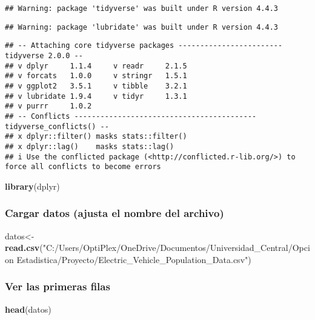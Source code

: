 \documentclass[
]{article}
\newenvironment{Shaded}{\begin{snugshade}}{\end{snugshade}}
\newcommand{\FunctionTok}[1]{\textcolor[rgb]{0.13,0.29,0.53}{\textbf{#1}}}
\newcommand{\NormalTok}[1]{#1}
\newcommand{\OtherTok}[1]{\textcolor[rgb]{0.56,0.35,0.01}{#1}}
\newcommand{\StringTok}[1]{\textcolor[rgb]{0.31,0.60,0.02}{#1}}
\begin{document}
\begin{verbatim}
## Warning: package 'tidyverse' was built under R version 4.4.3
\end{verbatim}

\begin{verbatim}
## Warning: package 'lubridate' was built under R version 4.4.3
\end{verbatim}

\begin{verbatim}
## -- Attaching core tidyverse packages ------------------------ tidyverse 2.0.0 --
## v dplyr     1.1.4     v readr     2.1.5
## v forcats   1.0.0     v stringr   1.5.1
## v ggplot2   3.5.1     v tibble    3.2.1
## v lubridate 1.9.4     v tidyr     1.3.1
## v purrr     1.0.2     
## -- Conflicts ------------------------------------------ tidyverse_conflicts() --
## x dplyr::filter() masks stats::filter()
## x dplyr::lag()    masks stats::lag()
## i Use the conflicted package (<http://conflicted.r-lib.org/>) to force all conflicts to become errors
\end{verbatim}

\begin{Shaded}
\begin{Highlighting}[]
\FunctionTok{library}\NormalTok{(dplyr)}
\end{Highlighting}
\end{Shaded}

\subsubsection{Cargar datos (ajusta el nombre del
archivo)}\label{cargar-datos-ajusta-el-nombre-del-archivo}

\begin{Shaded}
\begin{Highlighting}[]
\NormalTok{datos}\OtherTok{\textless{}{-}} \FunctionTok{read.csv}\NormalTok{(}\StringTok{"C:/Users/OptiPlex/OneDrive/Documentos/Universidad\_Central/Opcion Estadistica/Proyecto/Electric\_Vehicle\_Population\_Data.csv"}\NormalTok{)}
\end{Highlighting}
\end{Shaded}

\subsubsection{Ver las primeras filas}\label{ver-las-primeras-filas}

\begin{Shaded}
\begin{Highlighting}[]
\FunctionTok{head}\NormalTok{(datos)}
\end{Highlighting}
\end{Shaded}
\end{document}

